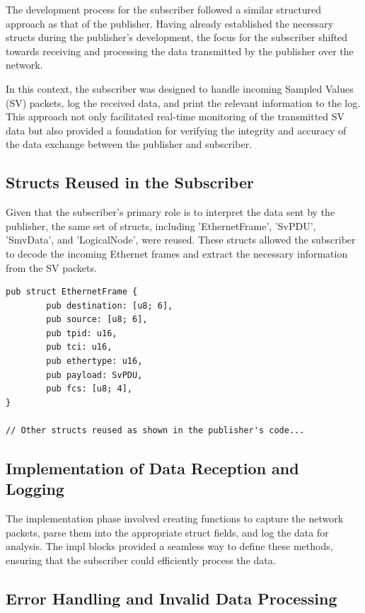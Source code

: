The development process for the subscriber followed a similar structured approach as that of the publisher. Having already established the necessary structs during the publisher's development, the focus for the subscriber shifted towards receiving and processing the data transmitted by the publisher over the network.

In this context, the subscriber was designed to handle incoming Sampled Values (SV) packets, log the received data, and print the relevant information to the log. This approach not only facilitated real-time monitoring of the transmitted SV data but also provided a foundation for verifying the integrity and accuracy of the data exchange between the publisher and subscriber.

\subsection{Structs Reused in the Subscriber}

Given that the subscriber's primary role is to interpret the data sent by the publisher, the same set of structs, including 'EthernetFrame', 'SvPDU', 'SmvData', and 'LogicalNode', were reused. These structs allowed the subscriber to decode the incoming Ethernet frames and extract the necessary information from the SV packets.

\begin{lstlisting}[caption={EthernetFrame struct.}]
	pub struct EthernetFrame {
		pub destination: [u8; 6],
		pub source: [u8; 6],
		pub tpid: u16,
		pub tci: u16,
		pub ethertype: u16,
		pub payload: SvPDU,
		pub fcs: [u8; 4],
}

// Other structs reused as shown in the publisher's code...
\end{lstlisting}

\subsection{Implementation of Data Reception and Logging}

The implementation phase involved creating functions to capture the network packets, parse them into the appropriate struct fields, and log the data for analysis. The impl blocks provided a seamless way to define these methods, ensuring that the subscriber could efficiently process the data.

\subsection{Error Handling and Invalid Data Processing}

